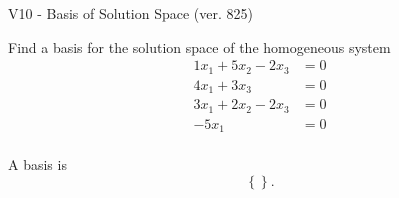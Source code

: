 \begin{exercise}
  \begin{exerciseTitle}V10 - Basis of Solution Space (ver. 825)\end{exerciseTitle}
  \begin{exerciseStatement}
    Find a basis for the solution space of the homogeneous system 
\begin{align*}
 1 x_ 1 + 5 x_ 2 -2 x_ 3 &= 0  \\ 
  4 x_ 1 + 3 x_ 3 &= 0  \\ 
  3 x_ 1 + 2 x_ 2 -2 x_ 3 &= 0  \\ 
  -5 x_ 1 &= 0  \\ 
 \end{align*}


 
  \end{exerciseStatement}

  \begin{exerciseAnswer}
   A basis is   
\[\left\{\right\}.\]

  


  \end{exerciseAnswer}
\end{exercise}